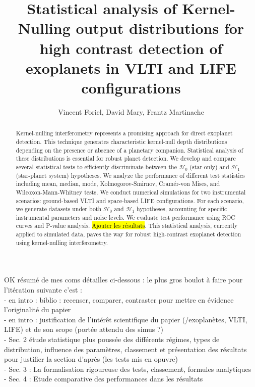\documentclass{article}
\title{Statistical analysis of Kernel-Nulling output distributions for high contrast detection of exoplanets in VLTI and LIFE configurations}
\author{Vincent Foriel,
        David Mary,
        Frantz Martinache
       }
\newcommand{\dm}[1]{{\color{mulberry} #1}}
\begin{document}
\maketitle

\begin{abstract}
Kernel-nulling interferometry represents a promising approach for direct exoplanet detection. This technique generates characteristic kernel-null depth distributions depending on the presence or absence of a planetary companion. Statistical analysis of these distributions is essential for robust planet detection. We develop and compare several statistical tests to efficiently discriminate between the $\mathcal{H}_0$ (star-only) and $\mathcal{H}_1$ (star-planet system) hypotheses. We analyze the performance of different test statistics including mean, median, mode, Kolmogorov-Smirnov, Cramér-von Mises, and Wilcoxon-Mann-Whitney tests. We conduct numerical simulations for two instrumental scenarios: ground-based VLTI and space-based LIFE configurations. For each scenario, we generate datasets under both $\mathcal{H}_0$ and $\mathcal{H}_1$ hypotheses, accounting for specific instrumental parameters and noise levels. We evaluate test performance using ROC curves and P-value analysis. \hl{Ajouter les résultats}. This statistical analysis, currently applied to simulated data, paves the way for robust high-contrast exoplanet detection using kernel-nulling interferometry.
\end{abstract}


\dm{OK résumé de mes coms détailles ci-dessous : le plus gros boulot à faire pour l'itération suivante c'est : \\
- en intro : biblio : recenser, comparer, contraster pour mettre en évidence l'originalité du papier\\
- en intro : justification de l'intérêt scientifique du papier (/exoplanètes, VLTI, LIFE) et de son scope (portée attendu des simus ?) \\
- Sec. 2 étude statistique plus poussée des différents régimes, types de distribution, influence des paramètres, classement et présentation des résultats pour justifier la section d'après (les tests mis en opuvre)\\
- Sec. 3 : La formalisation rigoureuse des tests, classement, formules analytiques \\
- Sec. 4 : Etude comparative des performances dans les résultats }
\end{document}
